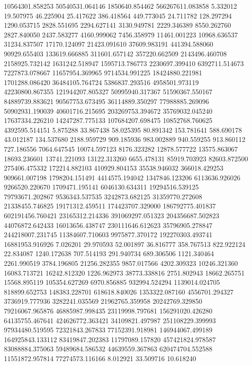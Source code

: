 10564301.858253
50540531.064146
1850640.854462
566267611.083858
5.332012
19.507975
46.225904
25.417622
386.418564
449.773045
24.711782
128.297294
1290.053715
2828.551695
2294.627141
3130.949781
2229.346389
8550.262760
2827.840050
2437.583277
4160.999062
7456.358979
11461.001223
10968.636537
31234.837507
17170.124097
21423.091610
37609.983191
441394.588060
90929.655403
133619.666885
311601.657142
357220.662509
2143496.460708
2158925.732142
1631242.518947
1595713.786773
2230697.399410
6392711.514673
7227873.078667
11657954.369965
9714534.991225
18424880.221981
1701288.086420
36484105.764724
5386837.293516
4958501.973119
42230800.867355
121944207.805327
50995940.317367
51590367.550167
84889739.883621
90567753.673495
36114889.350297
77988885.269096
50902931.190039
40601716.215695
203269753.394672
35769032.045240
17637334.226210
14247287.775133
107684207.698475
10852768.760625
4392595.514151
5.875288
33.867438
58.025395
80.891342
153.781641
588.690178
43.012187
134.537680
2188.959729
909.185936
983.002889
940.559255
913.860112
727.186556
7064.647545
10074.597123
8176.323282
12878.577722
13575.863067
18693.236601
13741.221093
13122.313260
6655.478131
85919.703923
82603.872500
275406.475332
172214.882103
410929.804153
35538.946032
366018.429253
909661.007198
1798204.151491
4414575.194042
1347846.123206
6113636.926026
9266520.220670
1709471.195141
6046130.634311
19294516.539125
79793671.202867
9536343.537535
3242873.682125
31359770.272608
21338455.746825
19171312.459511
174423707.329000
186792775.401837
602191456.760421
23165312.214336
391069297.051323
204356687.502823
44076872.642433
16013656.438747
230111646.612623
35796905.278847
244218007.231745
11384607.710603
9975877.370172
192270303.493741
16881953.916926
7.026201
29.970593
52.001897
36.816777
358.767513
822.922124
22.834087
1240.172638
707.514193
291.940734
689.306506
1121.340464
2261.990519
3784.196805
21256.282355
9857.017566
4202.309323
10246.321360
16083.713721
16242.812320
1226.962973
38773.338816
2751.802943
18662.265751
15568.895119
105354.627269
6970.856885
932994.524294
1139014.024705
818899.652753
148383.228701
618618.840026
1353322.087160
4556701.294327
3736919.777936
3282241.035569
21962765.359958
20242769.329850
79216067.965876
46885987.998435
23119998.797681
156291020.426280
64135755.467641
424626772.363421
34109821.497987
251108229.399993
97934480.519595
72321843.267833
77152391.918981
146944067.499189
164925843.133112
83419847.202383
11797089.157820
457421824.978587
83088884.375063
59489684.586532
44639559.367863
620474704.552588
11551872.957814
77274573.116166
8.012921
33.509716
10.618240
